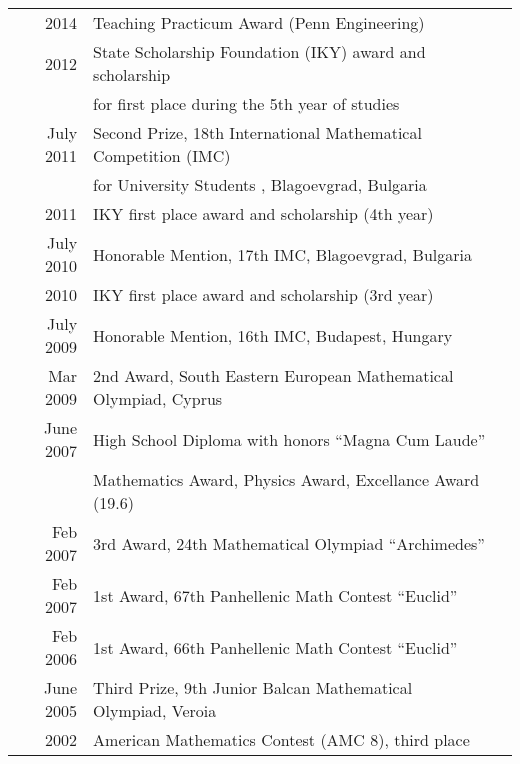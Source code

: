 \documentclass[letterpaper]{deedy-resume} %
\begin{document}
\begin{minipage}[t]{0.66\textwidth}
\begin{tabular}{rll}
  2014	 & Teaching Practicum Award (Penn Engineering) \\
  2012 & State Scholarship Foundation (IKY) award and scholarship \\
       & for first place during the 5th year of studies \\
  July  2011  &  Second  Prize,  18th  International Mathematical Competition (IMC) \\
  &  for University Students , Blagoevgrad, Bulgaria \\
  2011 & IKY first place award and scholarship (4th year)\\
  July 2010 &  Honorable Mention,  17th IMC, Blagoevgrad, Bulgaria \\
  2010 & IKY first place award and scholarship (3rd year)\\
  July 2009 &  Honorable Mention,  16th IMC, Budapest, Hungary\\
  Mar 2009  &  2nd Award, South Eastern European Mathematical Olympiad, Cyprus\\

  June  2007 &   High  School  Diploma with  honors  “Magna  Cum  Laude”\\
             &   Mathematics Award, Physics Award,  Excellance Award (19.6)\\
  Feb 2007 &  3rd Award, 24th Mathematical Olympiad “Archimedes”\\
  Feb 2007 &  1st Award, 67th Panhellenic Math Contest “Euclid”\\
  Feb 2006 &  1st Award, 66th Panhellenic Math Contest “Euclid”\\
  June 2005 &  Third Prize, 9th Junior Balcan Mathematical Olympiad, Veroia\\
  2002 & American Mathematics Contest (AMC 8), third place\\
  
\end{tabular}

\sectionspace %


\end{minipage}
\end{document}
